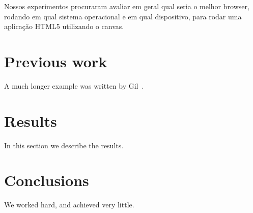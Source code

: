 \documentclass[12pt]{article}
\begin{document}
Nossos experimentos procuraram avaliar em geral qual seria o melhor browser, rodando em qual sistema operacional e
em qual dispositivo, para rodar uma aplicação HTML5 utilizando o canvas.

\section{Previous work}\label{previous work}
A much longer \LaTeXe{} example was written by Gil~\cite{Einstein}.

\section{Results}\label{results}
In this section we describe the results.

\section{Conclusions}\label{conclusions}
We worked hard, and achieved very little.



\end{document}
